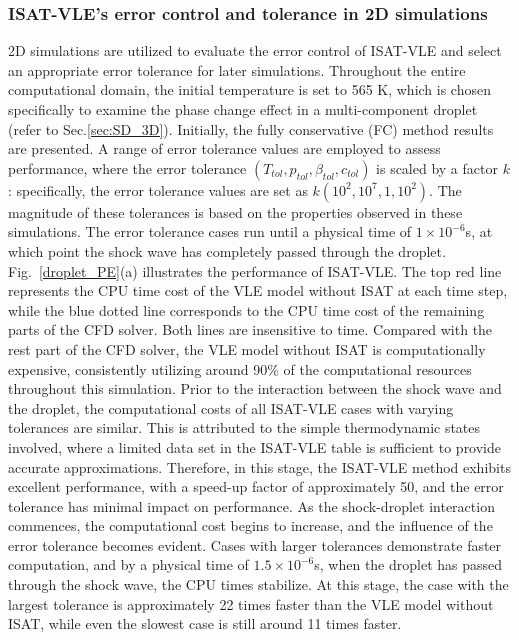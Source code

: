 \subsubsection{ISAT-VLE's error control and tolerance in 2D simulations}
2D simulations are utilized to evaluate the error control of ISAT-VLE and select an appropriate error tolerance for later simulations. Throughout the entire computational domain, the initial temperature is set to 565 K, which is chosen specifically to examine the phase change effect in a multi-component droplet (refer to Sec.\ref{sec:SD_3D}). Initially, the fully conservative (FC) method results are presented. A range of error tolerance values are employed to assess performance, where the error tolerance $(T_{tol},p_{tol},\beta_{tol},c_{tol})$ is scaled by a factor $k$: specifically, the error tolerance values are set as $k (10^2, 10^7, 1, 10^2)$. The magnitude of these tolerances is based on the properties observed in these simulations. The error tolerance cases run until a physical time of $1\times 10^{-6}$s, at which point the shock wave has completely passed through the droplet. Fig.~\ref{droplet_PE}(a) illustrates the performance of ISAT-VLE. The top red line represents the CPU time cost of the VLE model without ISAT at each time step, while the blue dotted line corresponds to the CPU time cost of the remaining parts of the CFD solver. Both lines are insensitive to time. Compared with the rest part of the CFD solver, the VLE model without ISAT is computationally expensive, consistently utilizing around 90\% of the computational resources throughout this simulation. Prior to the interaction between the shock wave and the droplet, the computational costs of all ISAT-VLE cases with varying tolerances are similar. This is attributed to the simple thermodynamic states involved, where a limited data set in the ISAT-VLE table is sufficient to provide accurate approximations. Therefore, in this stage, the ISAT-VLE method exhibits excellent performance, with a speed-up factor of approximately 50, and the error tolerance has minimal impact on performance. As the shock-droplet interaction commences, the computational cost begins to increase, and the influence of the error tolerance becomes evident. Cases with larger tolerances demonstrate faster computation, and by a physical time of $1.5\times 10^{-6}$s, when the droplet has passed through the shock wave, the CPU times stabilize. At this stage, the case with the largest tolerance is approximately 22 times faster than the VLE model without ISAT, while even the slowest case is still around 11 times faster. 

